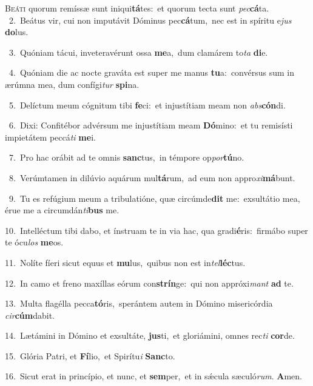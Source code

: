 \lettrine{\initial\textcolor{\initialcolor}{B}}{eáti} quorum remíssæ sunt iniqui\-\textbf{tá}\-tes:~\star et quorum tecta sunt \textit{pec}\-\textbf{cá}ta.\\
{\numbfont\textcolor{\numbcolor}{~2.}}~Beátus vir, cui non imputávit Dóminus pec\-\textbf{cá}\-tum,~\star nec est in spíritu e\textit{jus} \textbf{do}\-lus.\par
{\numbfont\textcolor{\numbcolor}{~3.}}~Quóniam tácui, inveteravérunt ossa \textbf{me}\-a,~\star dum clamárem to\textit{ta} \textbf{di}\-e.\par
{\numbfont\textcolor{\numbcolor}{~4.}}~Quóniam die ac nocte graváta est super me manus \textbf{tu}\-a:~\star convérsus sum in ærúmna mea, dum confígi\textit{tur} \textbf{spi}\-na.\par
{\numbfont\textcolor{\numbcolor}{~5.}}~Delíctum meum cógnitum tibi \textbf{fe}\-ci:~\star et injustítiam meam non \textit{abs}\-\textbf{cón}di.\par
{\numbfont\textcolor{\numbcolor}{~6.}}~Dixi: Confitébor advérsum me injustítiam meam \textbf{Dó}\-mino:~\star et tu remisísti impietátem peccá\textit{ti} \textbf{me}\-i.\par
{\numbfont\textcolor{\numbcolor}{~7.}}~Pro hac orábit ad te omnis \textbf{sanc}\-tus,~\star in témpore op\-\textit{por}\-\textbf{tú}no.\par
{\numbfont\textcolor{\numbcolor}{~8.}}~Verúmtamen in dilúvio aquárum mul\-\textbf{tá}\-rum,~\star ad eum non appro\-\textit{xi}\-\textbf{má}bunt.\par
{\numbfont\textcolor{\numbcolor}{~9.}}~Tu es refúgium meum a tribulatióne, quæ circúmde\textbf{dit} me:~\star exsultátio mea, érue me a circumdán\-\textit{ti}\-\textbf{bus} me.\par
{\numbfont\textcolor{\numbcolor}{10.}}~Intelléctum tibi dabo, et ínstruam te in via hac, qua gradi\-\textbf{é}\-ris:~\star firmábo super te ócu\textit{los} \textbf{me}\-os.\par
{\numbfont\textcolor{\numbcolor}{11.}}~Nolíte fíeri sicut equus et \textbf{mu}\-lus,~\star quibus non est in\-\textit{tel}\-\textbf{léc}tus.\par
{\numbfont\textcolor{\numbcolor}{12.}}~In camo et freno maxíllas eórum con\-\textbf{strín}\-ge:~\star qui non appróxi\textit{mant} \textbf{ad} te.\par
{\numbfont\textcolor{\numbcolor}{13.}}~Multa flagélla pecca\-\textbf{tó}\-ris,~\star sperántem autem in Dómino misericórdia \textit{cir}\-\textbf{cúm}dabit.\par
{\numbfont\textcolor{\numbcolor}{14.}}~Lætámini in Dómino et exsultáte, \textbf{jus}\-ti,~\star et gloriámini, omnes rec\textit{ti} \textbf{cor}\-de.\par
{\numbfont\textcolor{\numbcolor}{15.}}~Glória Patri, et \textbf{Fí}\-lio,~\star et Spirítu\textit{i} \textbf{Sanc}\-to.\par
{\numbfont\textcolor{\numbcolor}{16.}}~Sicut erat in princípio, et nunc, et \textbf{sem}\-per,~\star et in sǽcula sæculó\-\textit{rum}\-. \textbf{A}\-men.\par
